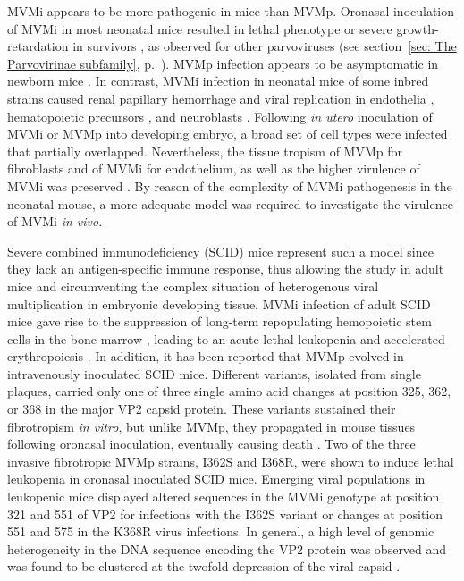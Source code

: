 MVMi appears to be more pathogenic in mice than MVMp. Oronasal inoculation of MVMi in most neonatal mice resulted in lethal phenotype or severe growth-retardation in survivors \cite{pmid3712557}, as observed for other parvoviruses (see section~\ref{sec: The Parvovirinae subfamily}, p.~\pageref{sec: The Parvovirinae subfamily}). MVMp infection appears to be asymptomatic in newborn mice \cite{pmid1373202}. In contrast, MVMi infection in neonatal mice of some inbred strains caused renal papillary hemorrhage and viral replication in endothelia \cite{pmid1653878}, hematopoietic precursors \cite{pmid7707557}, and neuroblasts \cite{pmid8892936}. Following \textit{in utero} inoculation of MVMi or MVMp into developing embryo, a broad set of cell types were infected that partially overlapped. Nevertheless, the tissue tropism of MVMp for fibroblasts and of MVMi for endothelium, as well as the higher virulence of MVMi was preserved \cite{pmid15308740}. 
By reason of the complexity of MVMi pathogenesis in the neonatal mouse, a more adequate model was required to investigate the virulence of MVMi \textit{in vivo}. 

Severe combined immunodeficiency (SCID) mice \cite{pmid6823332} represent such a model since they lack an antigen-specific immune response, thus allowing the study in adult mice and circumventing the complex situation of heterogenous viral multiplication in embryonic developing tissue. MVMi infection of adult SCID mice gave rise to the suppression of long-term repopulating hemopoietic stem cells in the bone marrow \cite{pmid12857918}, leading to an acute lethal leukopenia and accelerated erythropoiesis \cite{pmid9971754}.
In addition, it has been reported that MVMp evolved in intravenously inoculated SCID mice. Different variants, isolated from single plaques, carried only one of three single amino acid changes at position 325, 362, or 368 in the major VP2 capsid protein. These variants sustained their fibrotropism \textit{in vitro}, but unlike MVMp, they propagated in mouse tissues following oronasal inoculation, eventually causing death \cite{pmid16415031, pmid16103180}.
Two of the three invasive fibrotropic MVMp strains, I362S and I368R, were shown to induce lethal leukopenia in oronasal inoculated SCID mice. Emerging viral populations in leukopenic mice displayed altered sequences in the MVMi genotype at position 321 and 551 of VP2 for infections with the I362S variant or changes at position 551 and 575 in the K368R virus infections. In general, a high level of genomic heterogeneity in the DNA sequence encoding the VP2 protein was observed and was found to be clustered at the twofold depression of the viral capsid \cite{pmid18045943}.            	
	
